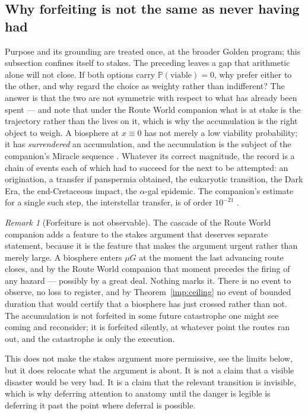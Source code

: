 \documentclass[11pt]{article}
\newcommand{\PP}{\mathbb{P}}
\theoremstyle{plain}
\theoremstyle{definition}
\theoremstyle{remark}
\newtheorem{remark}[theorem]{Remark}
\begin{document}
\subsection{Why forfeiting is not the same as never having had}
\label{hr:subsub:stakes}

\noindent Purpose and its grounding are treated once, at
the broader Golden program; this subsection confines itself to stakes. The preceding leaves a gap that arithmetic alone will not close. If both
options carry $\PP(\text{viable})=0$, why prefer either to the other,
and why regard the choice as weighty rather than indifferent? The answer is that the two are not symmetric with respect to what has
already been spent --- and note that under
the Route World companion \cite{RouteWorld} what is at stake is the trajectory
rather than the lives on it, which is why the accumulation is the right
object to weigh. A biosphere at $x\equiv0$ has not merely a low
viability probability; it has \emph{surrendered} an accumulation, and
the accumulation is the subject of the companion's Miracle sequence
\cite{Nexus}. Whatever its correct magnitude, the record is a chain of
events each of which had to succeed for the next to be attempted: an
origination, a transfer if panspermia obtained, the eukaryotic
transition, the Dark Era, the end-Cretaceous impact, the
$\alpha$-gal epidemic. The companion's estimate for a single such
step, the interstellar transfer, is of order $10^{-21}$
\cite{Nexus}.



\begin{remark}[Forfeiture is not observable]\label{hr:rem:silentforfeit}
The cascade of the Route World companion \cite{RouteWorld} adds a feature to the stakes
argument that deserves separate statement, because it is the feature
that makes the argument urgent rather than merely large. A biosphere enters $\mu G$ at the moment the last advancing route
closes, and by the Route World companion \cite{RouteWorld} that moment precedes the
firing of any hazard --- possibly by a great deal. Nothing marks it.
There is no event to observe, no loss to register, and by
Theorem~\ref{imp:ceiling} no event of bounded duration that would
certify that a biosphere has just crossed rather than not. The
accumulation is not forfeited in some future catastrophe one might see
coming and reconsider; it is forfeited silently, at whatever point the
routes ran out, and the catastrophe is only the execution.

This does not make the stakes argument more permissive, see the
limits below, but it does relocate what the argument is about. It is
not a claim that a visible disaster would be very bad. It is a claim
that the relevant transition is invisible, which is why deferring
attention to anatomy until the danger is legible is deferring it past
the point where deferral is possible.
\end{remark}
\end{document}
